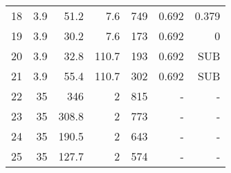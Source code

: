 \documentclass[review,3p]{elsarticle}
\begin{document}
\begin{table}[H]
\begin{tabular}{rrrrrrr}
18 & 3.9 & 51.2 & 7.6 & 749 & 0.692 & 0.379 \\

19 & 3.9 & 30.2 & 7.6 & 173 & 0.692 &  0 \\

20 & 3.9 & 32.8 & 110.7 & 193 & 0.692 & SUB \\

21 & 3.9 & 55.4 & 110.7 & 302 & 0.692 & SUB \\

22 & 35 & 346 &  2 & 815 &  - &  - \\

23 & 35 & 308.8 &  2 & 773 &  - &  - \\

24 & 35 & 190.5 &  2 & 643 &  - &  - \\

25 & 35 & 127.7 &  2 & 574 &  - &  - \\
\bottomrule
\end{tabular}  

\label{tab:statePointsReference}
\end{table}
\end{document}
